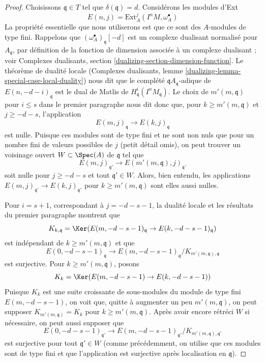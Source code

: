\begin{proof}
\medskip\noindent
Choisissons $\mathfrak q \in T$ tel que $\delta(\mathfrak q) = d$.
Considérons les modules d'Ext
$$
E(n, j) = \text{Ext}^j_A(I^nM, \omega_A^\bullet)
$$
La propriété essentielle que nous utiliserons est que ce sont des $A$-modules de type fini.
Rappelons que $(\omega_A^\bullet)_\mathfrak q[-d]$ est un complexe
dualisant normalisé pour $A_\mathfrak q$, par définition de la
fonction de dimension associée à un complexe dualisant ; voir
Complexes dualisants, section \ref{dualizing-section-dimension-function}.
Le théorème de dualité locale (Complexes dualisants, lemme
\ref{dualizing-lemma-special-case-local-duality}) nous dit que
le complété $\mathfrak qA_\mathfrak q$-adique de
$E(n, -d - i)_\mathfrak q$ est le dual de Matlis de
$H^i_\mathfrak q(I^nM_\mathfrak q)$. Le choix de
$m'(m, \mathfrak q)$ pour $i \leq s$ dans le premier paragraphe nous dit donc que,
pour $k \geq m'(m, \mathfrak q)$ et $j \geq -d - s$, l'application
$$
E(m, j)_\mathfrak q \to E(k, j)_\mathfrak q
$$
est nulle. Puisque ces modules sont de type fini et ne sont non nuls que
pour un nombre fini de valeurs possibles de $j$ (petit détail omis),
on peut trouver un voisinage ouvert $W \subset \Spec(A)$ de $\mathfrak q$
tel que
$$
E(m, j)_{\mathfrak q'} \to E(m'(m, \mathfrak q), j)_{\mathfrak q'}
$$
soit nulle pour $j \geq -d - s$ et tout $\mathfrak q' \in W$.
Alors, bien entendu, les applications $E(m, j)_{\mathfrak q'} \to E(k, j)_{\mathfrak q'}$
pour $k \geq m'(m, \mathfrak q)$ sont elles aussi nulles.

\medskip\noindent
Pour $i = s + 1$, correspondant à $j = - d - s - 1$, la dualité locale
et les résultats du premier paragraphe montrent que
$$
K_{k, \mathfrak q} =
\Ker(E(m, -d - s - 1)_\mathfrak q \to E(k, -d - s - 1)_\mathfrak q)
$$
est indépendant de $k \geq m'(m, \mathfrak q)$ et que
$$
E(0, -d - s - 1)_\mathfrak q \to
E(m, -d - s - 1)_\mathfrak q/K_{m'(m, \mathfrak q), \mathfrak q}
$$
est surjective. Pour $k \geq m'(m, \mathfrak q)$, posons
$$
K_k = \Ker(E(m, -d - s - 1) \to E(k, -d - s - 1))
$$
Puisque $K_k$ est une suite croissante de sous-modules du module de type fini
$E(m, -d - s - 1)$, on voit que, quitte à augmenter
un peu $m'(m, \mathfrak q)$, on peut supposer
$K_{m'(m, \mathfrak q)} = K_k$ pour $k \geq m'(m, \mathfrak q)$.
Après avoir encore rétréci $W$ si nécessaire, on peut aussi supposer que
$$
E(0, -d - s - 1)_{\mathfrak q'} \to
E(m, -d - s - 1)_{\mathfrak q'}/K_{m'(m, \mathfrak q), \mathfrak q'}
$$
est surjective pour tout $\mathfrak q' \in W$ (comme précédemment, on utilise que
ces modules sont de type fini
et que l'application est surjective après localisation en $\mathfrak q$).


\end{proof}
